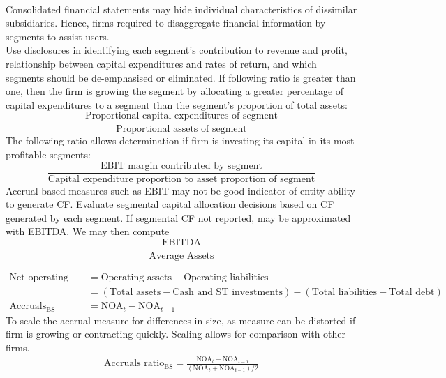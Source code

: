 \begin{remark} \\
Consolidated financial statements may hide individual characteristics of dissimilar subsidiaries. Hence, firms required to disaggregate financial information by segments to assist users.\\
Use disclosures in identifying each segment's contribution to revenue and profit, relationship between capital expenditures and rates of return, and which segments should be de-emphasised or eliminated.
If following ratio is greater than one, then the firm is growing the segment by allocating a greater percentage of capital expenditures to a segment than the segment's proportion of total assets:
\begin{equation}
\frac{\text{Proportional capital expenditures of segment}}{\text{Proportional assets of segment}} \nonumber
\end{equation} 
The following ratio allows determination if firm is investing its capital in its most profitable segments:
\begin{equation}
\frac{\text{EBIT margin contributed by segment}}{\text{Capital expenditure proportion to asset proportion of segment}} \nonumber
\end{equation}
Accrual-based measures such as EBIT may not be good indicator of entity ability to generate CF. Evaluate segmental capital allocation decisions based on CF generated by each segment. If segmental CF not reported, may be approximated with EBITDA. We may then compute
\begin{equation}
\frac{\text{EBITDA}}{\text{Average Assets}} \nonumber
\end{equation}
\end{remark}

\begin{definition} 
\begin{align}
\text{Net operating assets (NOA)} &= \text{Operating assets} - \text{Operating liabilities} \nonumber \\
&= (\text{Total assets} - \text{Cash and ST investments}) - (\text{Total liabilities} - \text{Total debt}) \nonumber \\
\text{Accruals}_{\text{BS}} &= \text{NOA}_{t} - \text{NOA}_{t-1} \nonumber
\end{align}
To scale the accrual measure for differences in size, as measure can be distorted if firm is growing or contracting quickly. Scaling allows for comparison with other firms.
\begin{align}
\text{Accruals ratio}_{\text{BS}} = \frac{\text{NOA}_{t} - \text{NOA}_{t-1}}{(\text{NOA}_{t} + \text{NOA}_{t-1})/2} \nonumber
\end{align} \nonumber
\end{definition}

